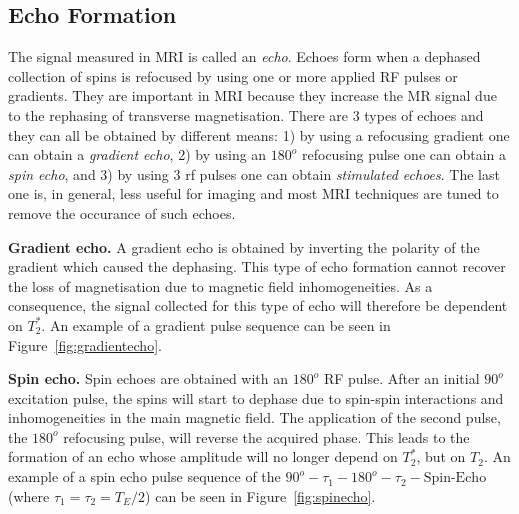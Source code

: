 \subsection{Echo Formation}

The signal measured in MRI is called an \textit{echo}. 
Echoes form when a dephased collection of spins is refocused by using one or more applied RF pulses or gradients. 
They are important in MRI because they increase the MR signal due to the rephasing of transverse magnetisation.
There are 3 types of echoes and they can all be obtained by different means: 1) by using a refocusing gradient one can obtain a \textit{gradient echo}, 2) by using an $180^o$ refocusing pulse one can obtain a \textit{spin echo}, and 3) by using 3 rf pulses one can obtain \textit{stimulated echoes}.
The last one is, in general, less useful for imaging and most MRI techniques are tuned to remove the occurance of such echoes.

\hfill

\textbf{Gradient echo.} A gradient echo is obtained by inverting the polarity of the gradient which caused the dephasing. 
This type of echo formation cannot recover the loss of magnetisation due to magnetic field inhomogeneities.
As a consequence, the signal collected for this type of echo will therefore be dependent on $T_2^*$. 
An example of a gradient pulse sequence can be seen in Figure~\ref{fig:gradientecho}.

\hfill

\textbf{Spin echo.} Spin echoes are obtained with an $180^o$ RF pulse. 
After an initial $90^o$ excitation pulse, the spins will start to dephase due to spin-spin interactions and inhomogeneities in the main magnetic field.
The application of the second pulse, the $180^o$ refocusing pulse, will reverse the acquired phase.
This leads to the formation of an echo whose amplitude will no longer depend on $T_2^*$, but on $T_2$.
An example of a spin echo pulse sequence of the $90^o - \tau_1 - 180^o - \tau_2 - \text{Spin-Echo}$ (where $\tau_1 = \tau_2 = T_E/2$) can be seen in Figure~\ref{fig:spinecho}.

